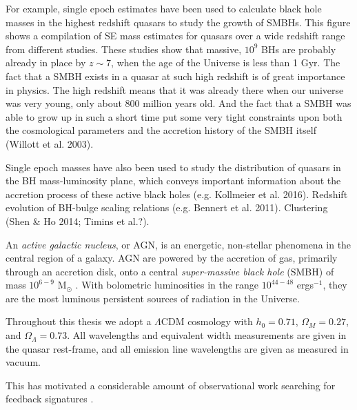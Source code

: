 For example, single epoch estimates have been used to calculate black hole masses in the highest redshift quasars to study the growth of SMBHs. 
This figure shows a compilation of SE mass estimates for quasars over a wide redshift range from different studies. 
These studies show that massive, $10^9$ BHs are probably already in place by $z\sim7$, when the age of the Universe is less than 1 Gyr.
The fact that a SMBH exists in a quasar at such high redshift is of great importance in physics.
The high redshift means that it was already there when our universe was very young, only about
800 million years old. And the fact that a SMBH was able to grow up in such a short time put
some very tight constraints upon both the cosmological parameters and the accretion history of the
SMBH itself (Willott et al. 2003).

Single epoch masses have also been used to study the distribution of quasars in the BH mass-luminosity plane, which conveys important information about the accretion process of these active black holes (e.g. Kollmeier et al. 2016). 
Redshift evolution of BH-bulge scaling relations (e.g. Bennert et al. 2011). 
Clustering (Shen \& Ho 2014; Timins et al.?). 

An {\it active galactic nucleus}, or AGN, is an energetic, non-stellar phenomena in the central region of a galaxy. AGN are powered by the accretion of gas, primarily through an accretion disk, onto a central {\it super-massive black hole} (SMBH) of mass $10^{6 - 9}$ M$_\odot$ \citep{lynden-bell69}. With bolometric luminosities in the range $10^{44 - 48}$ ergs$^{-1}$, they are the most luminous persistent sources of radiation in the Universe. 


Throughout this thesis we adopt a $\Lambda$CDM cosmology with $h_0=0.71$, $\Omega_M=0.27$, and $\Omega_\Lambda=0.73$. 
All wavelengths and equivalent width measurements are given in the quasar rest-frame, and all emission line wavelengths are given as measured in vacuum.


This has motivated a considerable amount of observational work searching for feedback signatures \citep[for recent reviews, see][]{alexander12,fabian12,heckman14}. 






